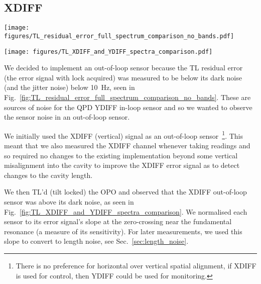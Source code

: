 \documentclass[aps,pra,superscriptaddress,reprint,nofootinbib]{revtex4-1}
\begin{document}
\subsection{XDIFF}

\begin{figure*}
\texttt{[image: figures/TL\_residual\_error\_full\_spectrum\_comparison\_no\_bands.pdf]}
\caption{SR785 measurements from 2020-12-23 of the TL YDIFF residual error (blue) compared against dark noise (orange) and jitter noise (green).}
\label{fig:TL_residual_error_full_spectrum_comparison_no_bands}
\end{figure*}

\begin{figure*}
\texttt{[image: figures/TL\_XDIFF\_and\_YDIFF\_spectra\_comparison.pdf]}
\caption{SR785 measurements from 2021-01-06 comparing the XDIFF and YDIFF residual errors against their dark noises while TL’d against YDIFF. We see that YDIFF goes below dark noise below 10~Hz but that XDIFF remains above dark noise throughout. The residual errors are normalised to the gradient at the zero-crossing in the scanned cavity error signal, i.e.\ normalised to the sensitivity of each sensor, but the dark noise measurements are not normalised.}
\label{fig:TL_XDIFF_and_YDIFF_spectra_comparison}
\end{figure*}

We decided to implement an out-of-loop sensor because the TL residual error (the error signal with lock acquired) was measured to be below its dark noise (and the jitter noise) below 10~Hz, seen in Fig.~\ref{fig:TL_residual_error_full_spectrum_comparison_no_bands}. These are sources of noise for the QPD YDIFF in-loop sensor and so we wanted to observe the sensor noise in an out-of-loop sensor.

We initially used the XDIFF (vertical) signal as an out-of-loop sensor~\footnote{There is no preference for horizontal over vertical spatial alignment, if XDIFF is used for control, then YDIFF could be used for monitoring.}. This meant that we also measured the XDIFF channel whenever taking readings and so required no changes to the existing implementation beyond some vertical misalignment into the cavity to improve the XDIFF error signal as to detect changes to the cavity length.

We then TL’d (tilt locked) the OPO and observed that the XDIFF out-of-loop sensor was above its dark noise, as seen in Fig.~\ref{fig:TL_XDIFF_and_YDIFF_spectra_comparison}. We normalised each sensor to its error signal’s slope at the zero-crossing near the fundamental resonance (a measure of its sensitivity). For later measurements, we used this slope to convert to length noise, see Sec.~\ref{sec:length_noise}.
\end{document}
